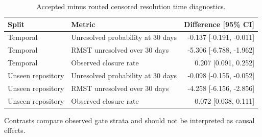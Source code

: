 \begin{table}[t]
\centering
\scriptsize
\caption{Accepted minus routed censored resolution time diagnostics.}
\label{tab:aidev-survival}
\begin{tabular}{llr}
\toprule
Split & Metric & Difference [95\% CI] \\
\midrule
Temporal & Unresolved probability at 30 days & -0.137 [-0.191, -0.011] \\
Temporal & RMST unresolved over 30 days & -5.306 [-6.788, -1.962] \\
Temporal & Observed closure rate & 0.207 [0.091, 0.252] \\
Unseen repository & Unresolved probability at 30 days & -0.098 [-0.155, -0.052] \\
Unseen repository & RMST unresolved over 30 days & -4.258 [-6.156, -2.856] \\
Unseen repository & Observed closure rate & 0.072 [0.038, 0.111] \\
\bottomrule
\end{tabular}
\par\footnotesize{Contrasts compare observed gate strata and should not be interpreted as causal effects.}
\end{table}
